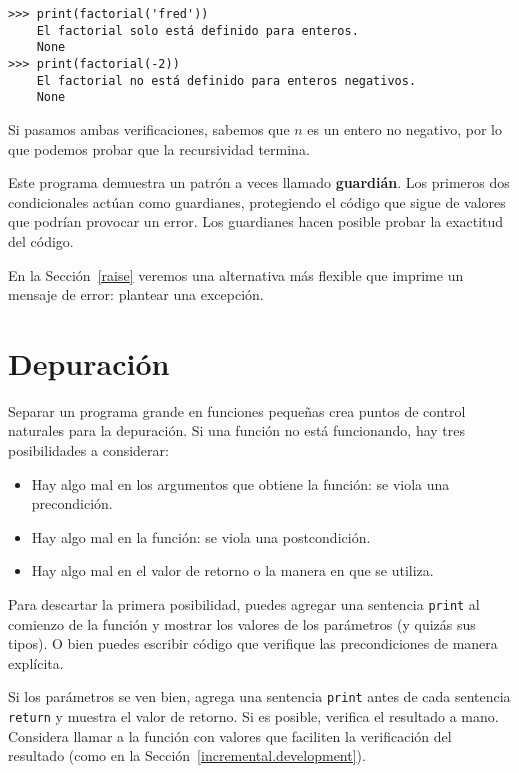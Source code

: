 \documentclass[10pt]{book}
\begin{document}
\begin{verbatim}
>>> print(factorial('fred'))
    El factorial solo está definido para enteros.
    None
>>> print(factorial(-2))
    El factorial no está definido para enteros negativos.
    None
\end{verbatim}
%
Si pasamos ambas verificaciones, sabemos que $n$ es un entero no negativo, por lo que podemos probar que la recursividad termina.

Este programa demuestra un patrón a veces llamado {\bf guardián}.
Los primeros dos condicionales actúan como guardianes, protegiendo el código que
sigue de valores que podrían provocar un error.  Los guardianes hacen
posible probar la exactitud del código.

En la Sección~\ref{raise} veremos una alternativa más flexible que imprime
un mensaje de error: plantear una excepción.


\section{Depuración}
\label{factdebug}

Separar un programa grande en funciones pequeñas crea puntos de control
naturales para la depuración.  Si una función no está
funcionando, hay tres posibilidades a considerar:

\begin{itemize}

\item Hay algo mal en los argumentos que obtiene
la función: se viola una precondición.

\item Hay algo mal en la función: se viola una
postcondición.

\item Hay algo mal en el valor de retorno o la
manera en que se utiliza.

\end{itemize}

Para descartar la primera posibilidad, puedes agregar una sentencia {\tt print}
al comienzo de la función y mostrar los valores de los
parámetros (y quizás sus tipos).  O bien puedes escribir código
que verifique las precondiciones de manera explícita.

Si los parámetros se ven bien, agrega una sentencia {\tt print} antes de cada
sentencia {\tt return} y muestra el valor de retorno.  Si es
posible, verifica el resultado a mano.  Considera llamar a la
función con valores que faciliten la verificación del resultado
(como en la Sección~\ref{incremental.development}).
\end{document}
